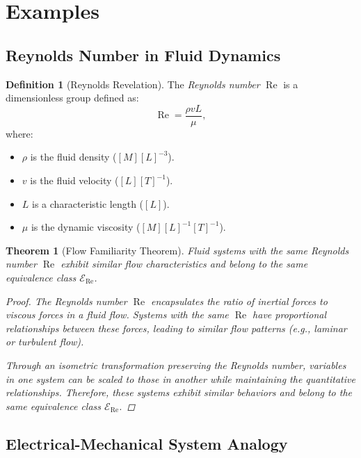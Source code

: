 \documentclass{article}
\newtheorem{theorem}{Theorem}[section]
\theoremstyle{definition}
\newtheorem{definition}{Definition}[section]
\theoremstyle{remark}
\begin{document}
	\section{Examples}
	
	\subsection{Reynolds Number in Fluid Dynamics}
	
	\begin{definition}[Reynolds Revelation]
		The \emph{Reynolds number} $\operatorname{Re}$ is a dimensionless group defined as:
		\[
		\operatorname{Re} = \dfrac{\rho v L}{\mu},
		\]
		where:
		\begin{itemize}
			\item $\rho$ is the fluid density ($[M][L]^{-3}$).
			\item $v$ is the fluid velocity ($[L][T]^{-1}$).
			\item $L$ is a characteristic length ($[L]$).
			\item $\mu$ is the dynamic viscosity ($[M][L]^{-1}[T]^{-1}$).
		\end{itemize}
	\end{definition}
	
	\begin{theorem}[Flow Familiarity Theorem]
		Fluid systems with the same Reynolds number $\operatorname{Re}$ exhibit similar flow characteristics and belong to the same equivalence class $\mathcal{E}_{\operatorname{Re}}$.
		
		\begin{proof}
			The Reynolds number $\operatorname{Re}$ encapsulates the ratio of inertial forces to viscous forces in a fluid flow. Systems with the same $\operatorname{Re}$ have proportional relationships between these forces, leading to similar flow patterns (e.g., laminar or turbulent flow).
			
			Through an isometric transformation preserving the Reynolds number, variables in one system can be scaled to those in another while maintaining the quantitative relationships. Therefore, these systems exhibit similar behaviors and belong to the same equivalence class $\mathcal{E}_{\operatorname{Re}}$.
		\end{proof}
	\end{theorem}
	
	\subsection{Electrical-Mechanical System Analogy}
	
\end{document}
